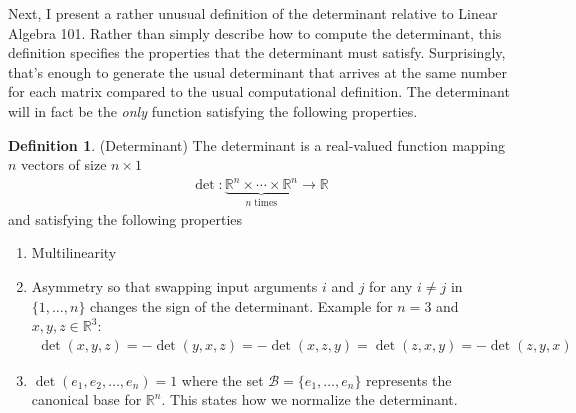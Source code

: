 \documentclass[12pt]{book}
\numberwithin{equation}{section} %
\theoremstyle{plain}
\theoremstyle{definition}
\newtheorem{defn}[thm]{Definition}
\theoremstyle{remark}
\newcommand{\R}{\mathbb{R}}
\begin{document}
Next, I present a rather unusual definition of the determinant relative
to Linear Algebra 101. Rather than simply describe how to compute the
determinant, this definition specifies the properties that the
determinant must satisfy. Surprisingly, that's enough to generate the
usual determinant that arrives at the same number for each matrix
compared to the usual computational definition. The determinant will in
fact be the \emph{only} function satisfying the following properties.

\begin{defn}{(Determinant)}
The determinant is a real-valued function mapping $n$ vectors of size
$n\times 1$
\begin{align*}
  \det: \underbrace{\R^n \times \cdots \times \R^n}_{n \;\text{times}}
  \rightarrow \R
\end{align*}
and satisfying the following properties
\begin{enumerate}
  \item Multilinearity
  \item Asymmetry so that swapping input arguments $i$ and $j$ for any
    $i\neq j$ in $\{1,\ldots,n\}$ changes the sign of the determinant.
    Example for $n=3$ and $x,y,z\in \R^3$:
    \begin{align*}
      \det(x,y,z) = -\det(y,x,z) = - \det(x,z,y)
      = \det(z,x,y) = -\det(z,y,x)
    \end{align*}
  \item $\det(e_1,e_2,\ldots,e_n)=1$ where the set
    $\mathcal{B}=\{e_1,\ldots,e_n\}$ represents the canonical base for
    $\R^n$. This states how we normalize the determinant.
\end{enumerate}
\end{defn}
\end{document}
